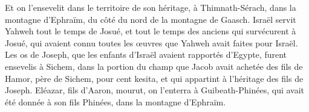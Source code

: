 \begin{multicols}{2}
Et on l’ensevelit dans le territoire de son héritage, à Thimnath-Sérach, dans la montagne d’Ephraïm, du côté du nord de la montagne de Gaasch.
Israël servit Yahweh tout le temps de Josué, et tout le temps des anciens qui survécurent à Josué, qui avaient connu toutes les œuvres que Yahweh avait faites pour Israël.
Les os de Joseph\FTNT{}, que les enfants d’Israël avaient rapportés d’Egypte, furent ensevelis à Sichem, dans la portion du champ que Jacob avait achetée des fils de Hamor, père de Sichem, pour cent kesita, et qui appartint à l’héritage des fils de Joseph.
Eléazar, fils d’Aaron, mourut, on l’enterra à Guibeath-Phinées, qui avait été donnée à son fils Phinées, dans la montagne d’Ephraïm.
\PPE{}
\end{multicols}
